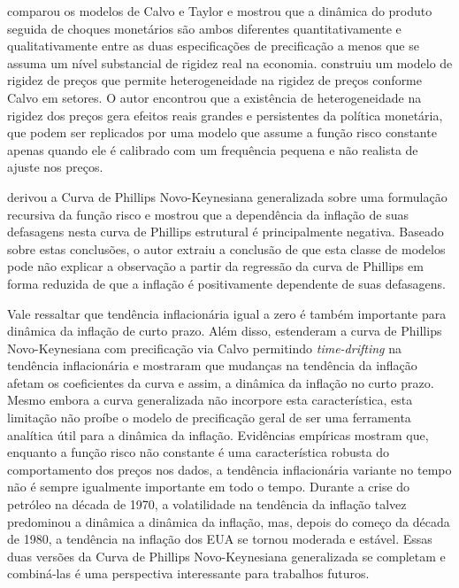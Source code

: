 \documentclass[twoside,a4paper,11pt]{report}
\begin{document}
\citet{kiley2002partial} comparou os modelos de Calvo e Taylor e mostrou que a dinâmica do produto seguida de choques monetários são ambos diferentes quantitativamente e qualitativamente entre as duas especificações de precificação a menos que se assuma um nível substancial de rigidez real na economia. \citet{carvalho2006heterogeneity} construiu um modelo de rigidez de preços que permite heterogeneidade na rigidez de preços conforme Calvo em setores. O autor encontrou que a existência de heterogeneidade na rigidez dos preços gera efeitos reais grandes e persistentes da política monetária, que podem ser replicados por uma modelo que assume a função risco constante apenas quando ele é calibrado com um frequência pequena e não realista de ajuste nos preços. 

\citet{sheedy2010intrinsic} derivou a Curva de Phillips Novo-Keynesiana generalizada sobre uma formulação recursiva da função risco e mostrou que a dependência da inflação de suas defasagens nesta curva de Phillips estrutural é principalmente negativa. Baseado sobre estas conclusões, o autor extraiu a conclusão de que esta classe de modelos pode não explicar a observação a partir da regressão da curva de Phillips em forma reduzida de que a inflação é positivamente dependente de suas defasagens.

Vale ressaltar que tendência inflacionária igual a zero é também importante para dinâmica da inflação de curto prazo. Além disso, \citet{cogley2008trend} estenderam a curva de Phillips Novo-Keynesiana com precificação via Calvo permitindo \emph{time-drifting} na tendência inflacionária e mostraram que mudanças na tendência da inflação afetam os coeficientes da curva e assim, a dinâmica da inflação no curto prazo. Mesmo embora a curva generalizada não incorpore esta característica, esta limitação não proíbe o modelo de precificação geral de ser uma ferramenta analítica útil para a dinâmica da inflação. Evidências empíricas mostram que, enquanto a função risco não constante é uma característica robusta do comportamento dos preços nos dados, a tendência inflacionária variante no tempo não é sempre igualmente importante em todo o tempo. Durante a crise do petróleo na década de 1970, a volatilidade na tendência da inflação talvez predominou a dinâmica a dinâmica da inflação, mas, depois do começo da década de 1980, a tendência na inflação dos EUA se tornou moderada e estável. Essas duas versões da Curva de Phillips Novo-Keynesiana generalizada se completam e combiná-las é uma perspectiva interessante para trabalhos futuros.
\end{document}
